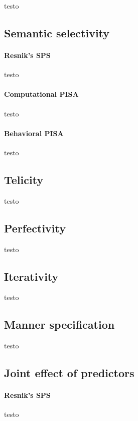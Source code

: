 testo

\subsection{Semantic selectivity} 

\paragraph{Resnik's SPS} testo

\paragraph{Computational PISA} testo

\paragraph{Behavioral PISA} testo

\subsection{Telicity} 

testo

\subsection{Perfectivity} 

testo

\subsection{Iterativity}

testo

\subsection{Manner specification} 

testo

\subsection{Joint effect of predictors} 



\paragraph{Resnik's SPS} testo

